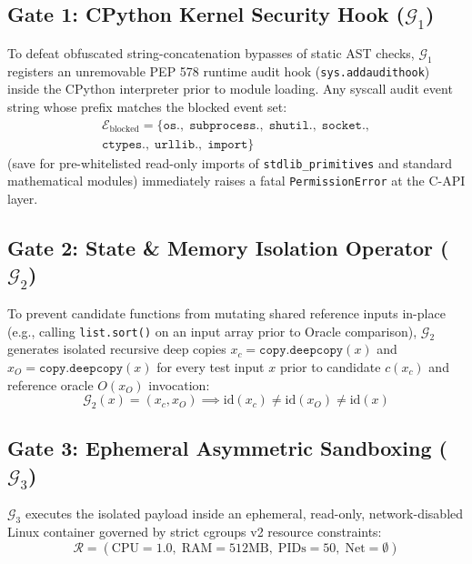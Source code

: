 \documentclass[10pt,twocolumn,letterpaper]{article}
\begin{document}
\subsection{Gate 1: CPython Kernel Security Hook ($\mathcal{G}_{1}$)}
To defeat obfuscated string-concatenation bypasses of static AST checks, $\mathcal{G}_{1}$ registers an unremovable PEP 578 runtime audit hook (\texttt{sys.\allowbreak addaudithook}) inside the CPython interpreter prior to module loading. Any syscall audit event string whose prefix matches the blocked event set:
\begin{multline}
\mathcal{E}_{\text{blocked}} = \{\texttt{os.},\; \texttt{subprocess.},\; \texttt{shutil.},\; \texttt{socket.}, \\
\texttt{ctypes.},\; \texttt{urllib.},\; \texttt{import}\}
\end{multline}
(save for pre-whitelisted read-only imports of \texttt{stdlib\_\allowbreak primitives} and standard mathematical modules) immediately raises a fatal \texttt{PermissionError} at the C-API layer.

\subsection{Gate 2: State \& Memory Isolation Operator ($\mathcal{G}_{2}$)}
To prevent candidate functions from mutating shared reference inputs in-place (e.g., calling \texttt{list.sort()} on an input array prior to Oracle comparison), $\mathcal{G}_{2}$ generates isolated recursive deep copies $x_{c}=\texttt{copy.deepcopy}(x)$ and $x_{O}=\texttt{copy.deepcopy}(x)$ for every test input $x$ prior to candidate $c(x_{c})$ and reference oracle $O(x_{O})$ invocation:
\begin{equation}
\mathcal{G}_{2}(x) = (x_{c}, x_{O}) \implies \text{id}(x_{c})\neq\text{id}(x_{O})\neq\text{id}(x)
\end{equation}

\subsection{Gate 3: Ephemeral Asymmetric Sandboxing ($\mathcal{G}_{3}$)}
$\mathcal{G}_{3}$ executes the isolated payload inside an ephemeral, read-only, network-disabled Linux container governed by strict cgroups v2 resource constraints:
\begin{equation}
\mathcal{R} = (\text{CPU}=1.0,\; \text{RAM}=512\text{MB},\; \text{PIDs}=50,\; \text{Net}=\emptyset)
\end{equation}
\end{document}
